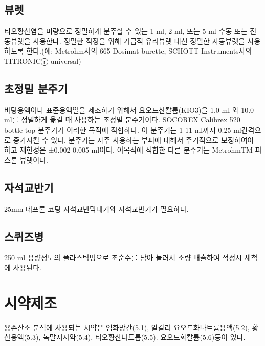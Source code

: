 \documentclass[
]{book}
\begin{document}
\hypertarget{uxbdf0uxb81b}{%
\subsection{뷰렛}\label{uxbdf0uxb81b}}

티오황산염을 미량으로 정밀하게 분주할 수 있는 1 ml, 2 ml, 또는 5 ml 수동 또는 전동뷰렛을 사용한다. 정밀한 적정을 위해 가급적 유리뷰렛 대신 정밀한 자동뷰렛을 사용하도록 한다.(예; Metrohm사의 665 Dosimat burette, SCHOTT Instruments사의 TITRONICⓡ universal)

\hypertarget{uxcd08uxc815uxbc00-uxbd84uxc8fcuxae30}{%
\subsection{초정밀 분주기}\label{uxcd08uxc815uxbc00-uxbd84uxc8fcuxae30}}

바탕용액이나 표준용액열을 제조하기 위해서 요오드산칼륨(KIO3)을 1.0 ml 와 10.0 ml를 정밀하게 옮길 때 사용하는 초정밀 분주기이다. SOCOREX Calibrex 520 bottle-top 분주기가 이러한 목적에 적합하다. 이 분주기는 1-11 ml까지 0.25 ml간격으로 증가시킬 수 있다. 분주기는 자주 사용하는 부피에 대해서 주기적으로 보정하여야 하고 재현성은 ±0.002-0.005 ml이다. 이목적에 적합한 다른 분주기는 MetrohmTM 피스톤 뷰렛이다.

\hypertarget{uxc790uxc11duxad50uxbc18uxae30}{%
\subsection{자석교반기}\label{uxc790uxc11duxad50uxbc18uxae30}}

25mm 테프론 코팅 자석교반막대기와 자석교반기가 필요하다.

\hypertarget{uxc2a4uxd034uxc988uxbcd1}{%
\subsection{스퀴즈병}\label{uxc2a4uxd034uxc988uxbcd1}}

250 ml 용량정도의 플라스틱병으로 초순수를 담아 눌러서 소량 배출하여 적정시 세척에 사용된다.

\hypertarget{uxc2dcuxc57duxc81cuxc870-3}{%
\section{시약제조}\label{uxc2dcuxc57duxc81cuxc870-3}}

용존산소 분석에 사용되는 시약은 염화망간(5.1), 알칼리 요오드화나트륨용액(5.2), 황산용액(5.3), 녹말지시약(5.4), 티오황산나트륨(5.5). 요오드화칼륨(5.6)등이 있다.
\end{document}
